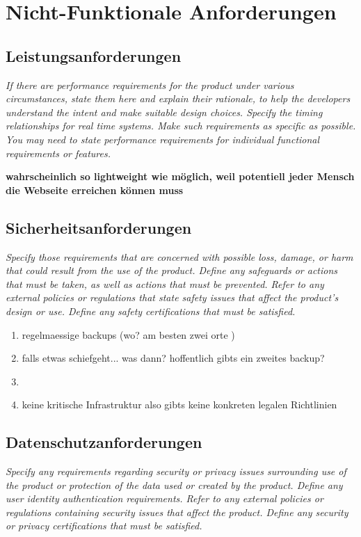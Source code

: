 \section{Nicht-Funktionale Anforderungen}

\subsection{Leistungsanforderungen}
\textit{If there are performance requirements for the product under various 
circumstances, state them here and explain their rationale, 
to help the developers understand the intent and make suitable design choices. 
Specify the timing relationships for real time systems. 
Make such requirements as specific as possible. 
You may need to state performance requirements 
for individual functional requirements or features.}

\textbf{wahrscheinlich so lightweight wie möglich, 
weil potentiell jeder Mensch die Webseite erreichen können muss}


\subsection{Sicherheitsanforderungen}
\textit{Specify those requirements that are concerned 
with possible loss, damage, or harm that could result from the use of the product. 
Define any safeguards or actions that must be taken, as well as actions that must be prevented. 
Refer to any external policies or regulations that state safety issues that affect the product’s design or use. 
Define any safety certifications that must be satisfied.}


\begin{enumerate}
    \item regelmaessige backups (wo? am besten zwei orte )
    \item falls etwas schiefgeht... was dann? hoffentlich gibts ein zweites backup?
    \item 
    \item keine kritische Infrastruktur also gibts keine konkreten legalen Richtlinien
\end{enumerate}



\subsection{Datenschutzanforderungen}
\textit{Specify any requirements regarding security or privacy issues 
surrounding use of the product or protection of the data used or created by the product.
Define any user identity authentication requirements. 
Refer to any external policies or regulations containing security issues that affect the product. 
Define any security or privacy certifications that must be satisfied.}

